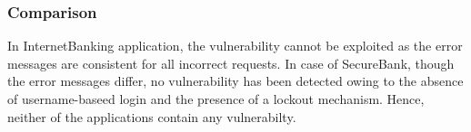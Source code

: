 \subsubsection{Comparison}
In InternetBanking application, the vulnerability cannot be exploited as the error messages are consistent for all incorrect requests.
In case of SecureBank, though the error messages differ, no vulnerability has been detected owing to the absence of username-baseed login and the presence of a lockout mechanism.
Hence, neither of the applications contain any vulnerabilty.
\clearpage